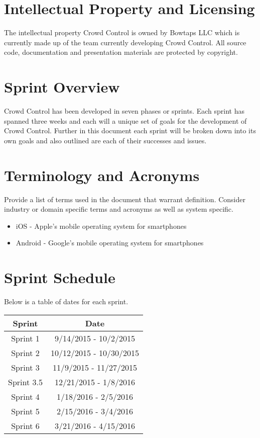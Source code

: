 \section{Intellectual Property and Licensing}
The intellectual property Crowd Control is owned by Bowtaps LLC which is currently made up of the team currently developing Crowd Control.  All source code, documentation and presentation materials are protected by copyright.

\section{Sprint  Overview}
Crowd Control has been developed in seven phases or sprints.  Each sprint has spanned three weeks and each will a unique set of goals for the development of Crowd Control.  Further in this document each sprint will be broken down into its own goals and also outlined are each of their successes and issues.

\section{Terminology and Acronyms}
Provide a list of terms used in the document that warrant definition.  Consider 
industry or domain specific terms and acronyms as well as system specific. 
\begin{itemize}
\item iOS - Apple's mobile operating system for smartphones
\item Android - Google's mobile operating system for smartphones
\end{itemize}

\section{Sprint Schedule}
Below is a table of dates for each sprint.\\
\begin{center}
	\begin{tabular}{|c|c|}
	\hline
	Sprint & Date\\
	\hline
	Sprint 1 & 9/14/2015 - 10/2/2015\\
	\hline
	Sprint 2 & 10/12/2015 - 10/30/2015\\
	\hline
	Sprint 3 & 11/9/2015 - 11/27/2015\\
	\hline
	Sprint 3.5 & 12/21/2015 - 1/8/2016\\
	\hline
	Sprint 4 & 1/18/2016 - 2/5/2016\\
	\hline
	Sprint 5 & 2/15/2016 - 3/4/2016\\
	\hline
	Sprint 6 & 3/21/2016 - 4/15/2016\\
	\hline
	\end{tabular}
\end{center}

